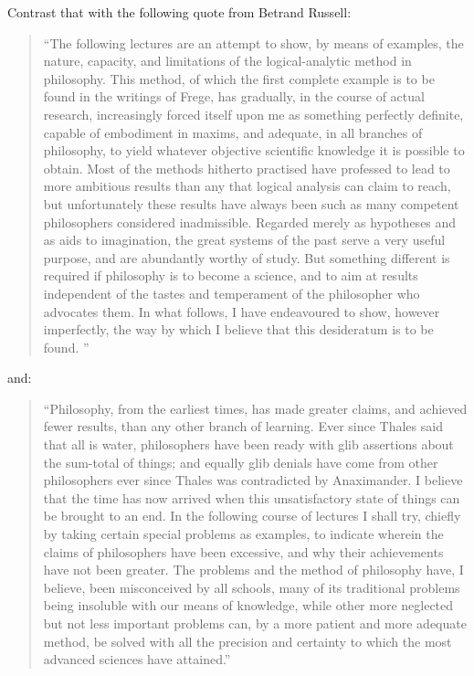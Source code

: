 \documentclass[10pt,titlepage]{article}
\begin{document}
Contrast that with the following quote from Betrand Russell:

\begin{quote}
  ``The following lectures are an attempt to show, by means of examples, the nature, capacity, and limitations of the logical-analytic method in philosophy. This method, of which the first complete example is to be found in the writings of Frege, has gradually, in the course of actual research, increasingly forced itself upon me as something perfectly definite, capable of embodiment in maxims, and adequate, in all branches of philosophy, to yield whatever objective scientific knowledge it is possible to obtain. Most of the methods hitherto practised have professed to lead to more ambitious results than any that logical analysis can claim to reach, but unfortunately these results have always been such as many competent philosophers considered inadmissible. Regarded merely as hypotheses and as aids to imagination, the great systems of the past serve a very useful purpose, and are abundantly worthy of study. But something different is required if philosophy is to become a science, and to aim at results independent of the tastes and temperament of the philosopher who advocates them. In what follows, I have endeavoured to show, however imperfectly, the way by which I believe that this desideratum is to be found.
''
\end{quote}

and:

\begin{quote}
  ``Philosophy, from the earliest times, has made greater claims, and achieved fewer results, than any other branch of learning. Ever since Thales said that all is water, philosophers have been ready with glib assertions about the sum-total of things; and equally glib denials have come from other philosophers ever since Thales was contradicted by Anaximander. I believe that the time has now arrived when this unsatisfactory state of things can be brought to an end. In the following course of lectures I shall try, chiefly by taking certain special problems as examples, to indicate wherein the claims of philosophers have been excessive, and why their achievements have not been greater. The problems and the method of philosophy have, I believe, been misconceived by all schools, many of its traditional problems being insoluble with our means of knowledge, while other more neglected but not less important problems can, by a more patient and more adequate method, be solved with all the precision and certainty to which the most advanced sciences have attained.''
\end{quote}
\end{document}
